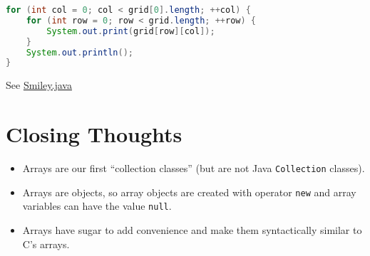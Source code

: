 \documentclass{article}
\begin{document}
\begin{lstlisting}[language=Java]
for (int col = 0; col < grid[0].length; ++col) {
    for (int row = 0; row < grid.length; ++row) {
        System.out.print(grid[row][col]);
    }
    System.out.println();
}
\end{lstlisting}

See \href{\code/arrays/Smiley.java}{Smiley.java}


\section{Closing Thoughts}

\begin{itemize}
\item Arrays are our first ``collection classes'' (but are not Java {\tt Collection} classes).
\item Arrays are objects, so array objects are created with operator {\tt new} and array variables can have the value {\tt null}.
\item Arrays have sugar to add convenience and make them syntactically similar to C's arrays.
\end{itemize}
\end{document}
